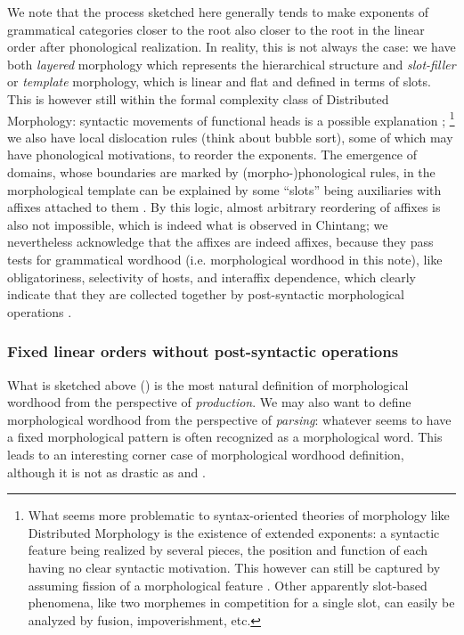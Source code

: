 \documentclass[a4paper, oneside, scheme=plain, 12pt]{article}
\begin{document}
We note that the process sketched here generally tends to 
make exponents of grammatical categories closer to the root also closer to the root
in the linear order after phonological realization.
In reality, this is not always the case:
we have both \emph{layered} morphology which represents the hierarchical structure
and \emph{slot-filler} or \emph{template} morphology, which is linear and flat and defined in terms of slots.
This is however still within the formal complexity class of Distributed Morphology:
syntactic movements of functional heads is a possible explanation
\citep{bye2020morpheme};%
\footnote{
    What seems more problematic to syntax-oriented theories of morphology like Distributed Morphology
    is the existence of extended exponents: a syntactic feature being realized by several pieces,
    the position and function of each having no clear syntactic motivation.
    This however can still be captured by assuming fission of a morphological feature \citep{bobaljik2017distributed}.
    Other apparently slot-based phenomena, like two morphemes in competition for a single slot, can easily be analyzed by fusion, impoverishment, etc.
}
we also have local dislocation rules (think about bubble sort), some of which may have phonological motivations,
to reorder the exponents.
The emergence of domains, whose boundaries are marked by (morpho-)phonological rules, 
in the morphological template can be explained by
some ``slots'' being auxiliaries with affixes attached to them \citep{mcdonough2008athabaskan}.
By this logic, almost arbitrary reordering of affixes is also not impossible,
which is indeed what is observed in Chintang;
we nevertheless acknowledge that the affixes are indeed affixes,
because they pass tests for grammatical wordhood (i.e. morphological wordhood in this note),
like obligatoriness, selectivity of hosts, and interaffix dependence,
which clearly indicate that they are collected together by post-syntactic morphological operations \citep{bickel2007free}.

\subsubsection{Fixed linear orders without post-syntactic operations}\label{sec:morphological-wordhood-linear}

What is sketched above ()
is the most natural definition of morphological wordhood from the perspective of \emph{production}.
We may also want to define morphological wordhood from the perspective of \emph{parsing}:
whatever seems to have a fixed morphological pattern
is often recognized as a morphological word.
This leads to an interesting corner case of morphological wordhood definition,
although it is not as drastic as  and .
\end{document}
